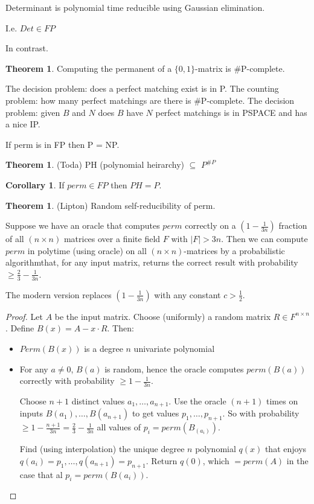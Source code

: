 \documentclass[a4paper,12pt]{article}
\theoremstyle{definition}
\newtheorem{theorem}[counter]{Theorem}
\newtheorem{corollary}[counter]{Corollary}
\theoremstyle{remark}
\begin{document}
Determinant is polynomial time reducible using Gaussian elimination.

I.e. $Det \in FP$

In contrast.

\begin{theorem}
    Computing the permanent of a $\{0, 1\}$-matrix is $\#$P-complete.
\end{theorem}

The decision problem: does a perfect matching exist is in P.
The counting problem: how many perfect matchings are there is $\#$P-complete.
The decision problem: given $B$ and $N$ does $B$ have $N$ perfect matchings is in PSPACE and has a nice IP.

If perm is in FP then P = NP.

\begin{theorem}
    (Toda)
    PH (polynomial heirarchy) $\subseteq$ $P^{\#P}$
\end{theorem}

\begin{corollary}
    If $perm \in FP$ then $PH = P$.
\end{corollary}

\begin{theorem}
    (Lipton)
    Random self-reducibility of perm.

    Suppose we have an oracle that computes $perm$ correctly on a $(1 - \frac{1}{3n})$ 
    fraction of all $(n \times n)$ matrices over a finite field $F$ with $|F| > 3n$.
    Then we can compute $perm$ in polytime (using oracle) on all $(n \times n)$-matrices 
    by a probabilistic algorithmthat, for any input matrix, returns the correct result with 
    probability $\geq \frac{2}{3} - \frac{1}{3n}$.
\end{theorem}

The modern version replaces $(1 - \frac{1}{3n})$  with any constant $c > \frac{1}{2}$.

\begin{proof}
    Let $A$ be the input matrix. Choose (uniformly) a random matrix $R \in F^{n \times n}$.
    Define $B(x) = A - x \cdot R$. Then:
    \begin{itemize}
        \item $Perm(B(x))$ is a degree $n$ univariate polynomial
        \item For any $a \neq 0$, $B(a)$ is random, hence the oracle computes $perm(B(a))$ 
        correctly with probability $\geq 1 - \frac{1}{3n}$.

        Choose $n + 1$ distinct values $a_1, \dots, a_{n + 1}$. Use the oracle $(n + 1)$ times on inputs $B(a_1), \dots, B(a_{n+1})$
        to get values $p_1, \dots, p_{n+1}$. So with probability $\geq 1 - \frac{n + 1}{3n} = \frac{2}{3} - \frac{1}{3n}$ all values
        of $p_i = perm(B_(a_i))$.

        Find (using interpolation) the unique degree $n$ polynomial $q(x)$ that enjoys $q(a_i) = p_1, \dots, q(a_{n + 1}) = p_{n + 1}$.
        Return $q(0)$, which $= perm(A)$ in the case that al $p_i = perm(B(a_i))$.
    \end{itemize}
\end{proof}
\end{document}
